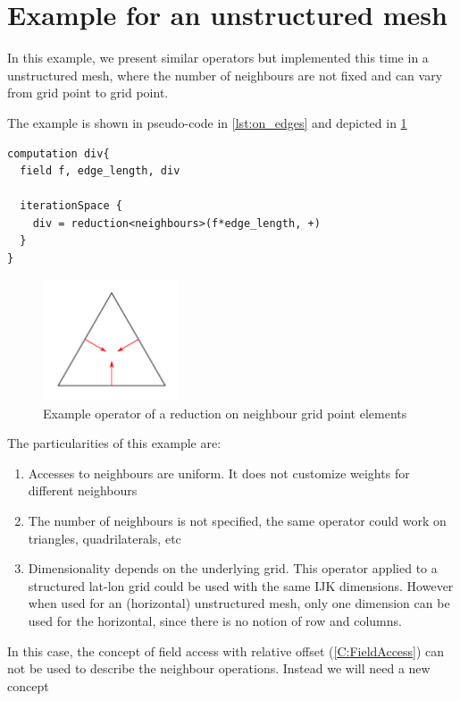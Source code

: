 \documentclass[a4paper,10pt]{scrartcl}
\begin{document}
\section{Example for an unstructured mesh}
In this example, we present similar operators but implemented this time in a unstructured mesh, where the number of neighbours are not fixed and can vary from grid point to grid point.

The example is shown in pseudo-code in \cref{lst:on_edges} and depicted in \cref{fig:on_edges}

\begin{lstlisting}[label=lst:on_edges, caption=Pseudo-code example of operator on neighbour grid points on an irregular grid]
computation div{
  field f, edge_length, div
  
  iterationSpace {
    div = reduction<neighbours>(f*edge_length, +)
  }
}
\end{lstlisting}

\begin{figure}[htp!]
	\includegraphics[width=4cm]{./on_edges.png}
	\caption{Example operator of a reduction on neighbour grid point elements}
	\label{fig:on_edges}
\end{figure}

The particularities of this example are:
\begin{enumerate}
	\item Accesses to neighbours are uniform. It does not customize weights for different neighbours
	\item The number of neighbours is not specified, the same operator could work on triangles, quadrilaterals, etc
	\item Dimensionality depends on the underlying grid. This operator applied to a structured lat-lon grid could be used with the same IJK dimensions. However when used for an (horizontal) unstructured mesh, only one dimension can be used for the horizontal, since there is no notion of row and columns.
\end{enumerate}

In this case, the concept of field access with relative offset (\cref{C:FieldAccess}) can
not be used to describe the neighbour operations. Instead we will need a new concept
\end{document}
